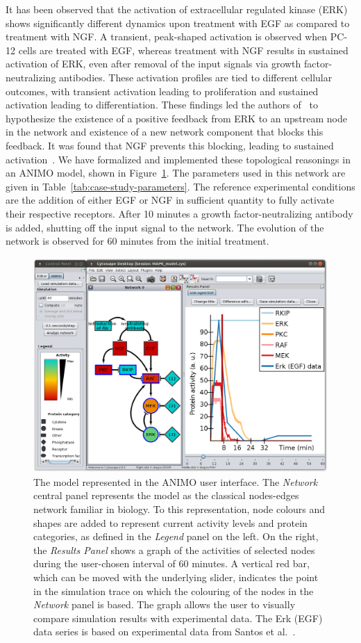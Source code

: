 \documentclass[journal, 10pt]{IEEEtran}
\begin{document}
It has been observed that the activation of extracellular regulated kinase (ERK) shows significantly different 
dynamics upon treatment with EGF as compared to treatment with NGF. A transient, peak-shaped 
activation is observed when PC-12 cells are treated with EGF, whereas treatment with NGF results in sustained activation of ERK,
even after removal of the input signals via growth factor-neutralizing antibodies. These activation profiles are tied to different cellular 
outcomes, with transient activation leading to proliferation and sustained activation leading to differentiation. 
These findings led the authors of~\cite{egf-ngf} to hypothesize the existence of a positive feedback from ERK to an upstream node in the network and 
existence of a new network component that blocks this feedback. It was found that NGF prevents this blocking, leading to sustained activation~\cite{egf-ngf}.
We have formalized and implemented these topological reasonings in an ANIMO model, shown in Figure~\ref{fig:case-study-model}. 
The parameters used in this network are given in Table~\ref{tab:case-study-parameters}.
The reference experimental conditions are the addition of either EGF or NGF
in sufficient quantity to fully activate their respective receptors. After 10 minutes a growth factor-neutralizing 
antibody is added, shutting off the input signal to the network. The evolution of the network is
observed for 60 minutes from the initial treatment.

\begin{figure}[htb]
\centering
  \includegraphics[width=.48\textwidth]{mapk_model_egf7}
\caption{The model represented in the ANIMO user interface.
The \emph{Network} central panel represents the model as the classical nodes-edges network
familiar in biology. To this representation, node colours and shapes are added %
to represent current activity levels and protein categories, as defined in the \emph{Legend}
panel on the left. On the right, the \emph{Results Panel} shows a graph of the activities
of selected nodes during the user-chosen interval of 60 minutes.
A vertical red bar, which can be moved with the underlying slider, indicates the point in
the simulation trace on which the colouring of the nodes in the \emph{Network} panel is based.
The graph allows the user to visually compare simulation results with experimental data.
The {\sf Erk (EGF) data} series is based on experimental data from Santos et al.~\cite{egf-ngf}.
}\label{fig:case-study-model}
\end{figure}
\end{document}

